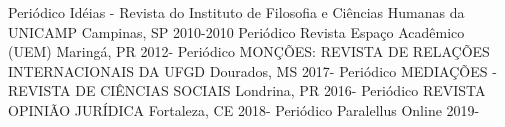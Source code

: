\begin{cvhonors}
  \cvhonor
    {Periódico}
    {Idéias - Revista do Instituto de Filosofia e Ciências Humanas da UNICAMP}
    {Campinas, SP}
    {2010-2010}
  \cvhonor
    {Periódico}
    {Revista Espaço Acadêmico (UEM)}
    {Maringá, PR}
    {2012-}
  \cvhonor
    {Periódico}
    {MONÇÕES: REVISTA DE RELAÇÕES INTERNACIONAIS DA UFGD}
    {Dourados, MS}
    {2017-}
  \cvhonor
    {Periódico}
    {MEDIAÇÕES - REVISTA DE CIÊNCIAS SOCIAIS}
    {Londrina, PR}
    {2016-}
  \cvhonor
    {Periódico}
    {REVISTA OPINIÃO JURÍDICA}
    {Fortaleza, CE}
    {2018-}
  \cvhonor
    {Periódico}
    {Paralellus}
    {Online}
    {2019-}
\end{cvhonors}
